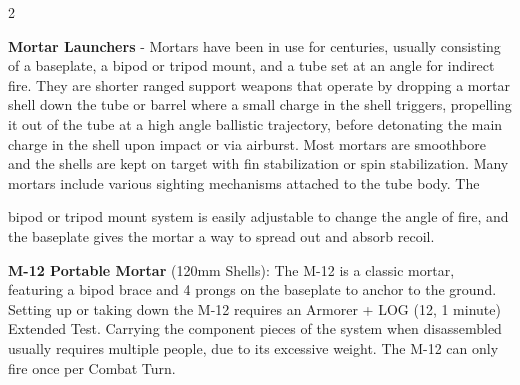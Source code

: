 \documentclass[
  oneside]{article}
\begin{document}
\begin{multicols}{2}

\textbf{Mortar Launchers} - Mortars have been in
use for centuries, usually consisting of a
baseplate, a bipod or tripod mount, and a tube set
at an angle for indirect fire. They are shorter
ranged support weapons that operate by dropping a
mortar shell down the tube or barrel where a small
charge in the shell triggers, propelling it out of
the tube at a high angle ballistic trajectory,
before detonating the main charge in the shell
upon impact or via airburst. Most mortars are
smoothbore and the shells are kept on target with
fin stabilization or spin stabilization. Many
mortars include various sighting mechanisms
attached to the tube body. The

bipod or tripod mount system is easily adjustable
to change the angle of fire, and the baseplate
gives the mortar a way to spread out and absorb
recoil.

\textbf{M-12 Portable Mortar} (120mm Shells): The
M-12 is a classic mortar, featuring a bipod brace
and 4 prongs on the baseplate to anchor to the
ground. Setting up or taking down the M-12
requires an Armorer + LOG (12, 1 minute) Extended
Test. Carrying the component pieces of the system
when disassembled usually requires multiple
people, due to its excessive weight. The M-12 can
only fire once per Combat Turn.

\end{multicols}
\end{document}
